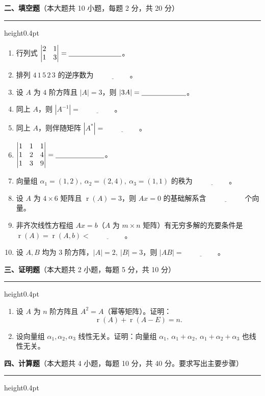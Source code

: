 \documentclass[12pt]{ctexart}
\newcommand{\bigsection}[2]{%
  \vspace{6pt}%
  {\noindent\bfseries\large #1}\hfill{\normalsize（本大题共 #2）}\par
  \vspace{2pt}\hrule height0.4pt\vspace{8pt}}
\newcommand{\blank}[1][2.6cm]{\underline{\hspace{#1}}}
\newcommand{\rank}{\operatorname{r}}
\begin{document}
\bigsection{二、填空题}{10 小题，每题 2 分，共 20 分}

\begin{enumerate}[label=\arabic*.]
\item 行列式 $\begin{vmatrix}2&1\\1&3\end{vmatrix}=\blank$。
\item 排列 $4\,1\,5\,2\,3$ 的逆序数为 $\blank[2cm]$。
\item 设 $A$ 为 $4$ 阶方阵且 $|A|=3$，则 $|3A|=\blank[2.2cm]$。
\item 同上 $A$，则 $|A^{-1}|=\blank[2cm]$。
\item 同上 $A$，则伴随矩阵 $|A^{*}|=\blank[2cm]$。
\item $\begin{vmatrix}1&1&1\\ 1&2&4\\ 1&3&9\end{vmatrix}=\blank[2.4cm]$。
\item 向量组 $\alpha_1=(1,2),\ \alpha_2=(2,4),\ \alpha_3=(1,1)$ 的秩为 $\blank[2cm]$。
\item 设 $A$ 为 $4\times 6$ 矩阵且 $\rank(A)=3$，则 $Ax=0$ 的基础解系含 $\blank[2cm]$ 个向量。
\item 非齐次线性方程组 $Ax=b$（$A$ 为 $m\times n$ 矩阵）有无穷多解的充要条件是
  $\rank(A)=\rank(A,b)<\blank[2cm]$。
\item 设 $A,B$ 均为 $3$ 阶方阵，$|A|=2,\ |B|=3$，则 $|AB|=\blank[2cm]$。
\end{enumerate}

\bigsection{三、证明题}{2 小题，每题 5 分，共 10 分}

\begin{enumerate}[label=\arabic*.]
\item 设 $A$ 为 $n$ 阶方阵且 $A^{2}=A$（幂等矩阵）。证明：
  \[
  \rank(A)+\rank(A-E)=n .
  \]

\item 设向量组 $\alpha_1,\alpha_2,\alpha_3$ 线性无关。证明：向量组
  $\alpha_1,\ \alpha_1+\alpha_2,\ \alpha_1+\alpha_2+\alpha_3$ 也线性无关。
\end{enumerate}

\bigsection{四、计算题}{4 小题，每题 10 分，共 40 分。要求写出主要步骤}
\end{document}
